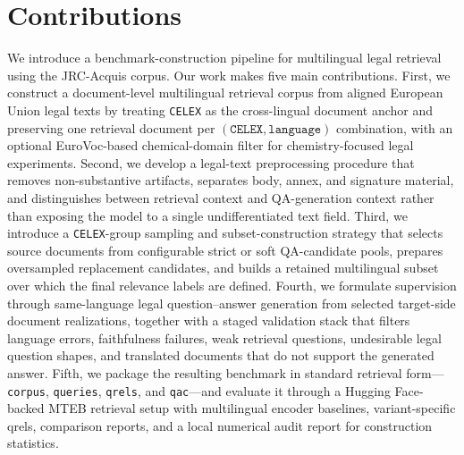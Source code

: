 \section{Contributions}

We introduce a benchmark-construction pipeline for multilingual legal retrieval using the JRC-Acquis corpus. Our work makes five main contributions. First, we construct a document-level multilingual retrieval corpus from aligned European Union legal texts by treating \texttt{CELEX} as the cross-lingual document anchor and preserving one retrieval document per \((\texttt{CELEX}, \texttt{language})\) combination, with an optional EuroVoc-based chemical-domain filter for chemistry-focused legal experiments. Second, we develop a legal-text preprocessing procedure that removes non-substantive artifacts, separates body, annex, and signature material, and distinguishes between retrieval context and QA-generation context rather than exposing the model to a single undifferentiated text field. Third, we introduce a \texttt{CELEX}-group sampling and subset-construction strategy that selects source documents from configurable strict or soft QA-candidate pools, prepares oversampled replacement candidates, and builds a retained multilingual subset over which the final relevance labels are defined. Fourth, we formulate supervision through same-language legal question--answer generation from selected target-side document realizations, together with a staged validation stack that filters language errors, faithfulness failures, weak retrieval questions, undesirable legal question shapes, and translated documents that do not support the generated answer. Fifth, we package the resulting benchmark in standard retrieval form---\texttt{corpus}, \texttt{queries}, \texttt{qrels}, and \texttt{qac}---and evaluate it through a Hugging Face-backed MTEB retrieval setup with multilingual encoder baselines, variant-specific qrels, comparison reports, and a local numerical audit report for construction statistics.
